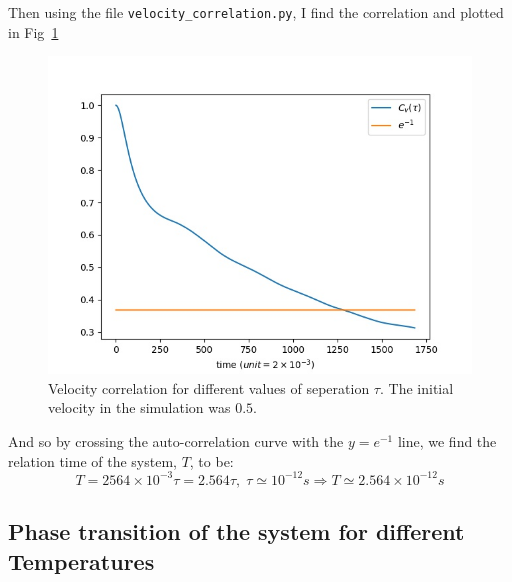 \documentclass[12pt, a4paper]{article}
\begin{document}
	Then using the file \texttt{velocity\_correlation.py}, I find the correlation and plotted in 
	Fig~\ref{fig:velocity_correlation}
	
	\begin{figure}[h!]
		\centering
		\includegraphics[width=.9\linewidth]{../results/velocity_correlation.jpg}
		\caption{Velocity correlation for different values of seperation $\tau$. The initial velocity in the simulation was 
			$0.5$.}
		\label{fig:velocity_correlation}
	\end{figure}
	
	And so by crossing the auto-correlation curve with the $y = e^{-1}$ line, we find the relation time of the 
	system, $T$, to be:
	\begin{equation}
		T = 2564 \times 10^{-3} \tau = 2.564 \tau, \; \tau \simeq 10^{-12} s \Rightarrow T \simeq 2.564 \times 
		10^{-12} s
	\end{equation}
	
	\subsection{Phase transition of the system for different Temperatures}
\end{document}
